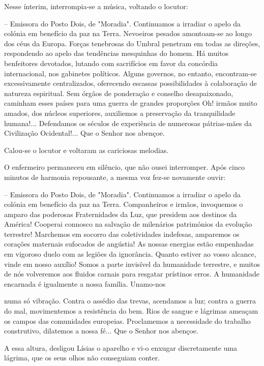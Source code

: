 \documentclass[portuguese,12pt,a4paper]{scrbook}
\begin{document}
	
	Nesse ínterim, interrompia-se a música, voltando o locutor:
	
	– Emissora do Posto Dois, de "Moradia". Continuamos a irradiar o apelo da colónia em benefício da paz na Terra. Nevoeiros pesados amontoam-se ao longo dos céus da Europa. Forças tenebrosas do Umbral penetram em todas as direções, respondendo ao apelo das tendências mesquinhas do homem. Há muitos benfeitores devotados, lutando com sacrifícios em favor da concórdia internacional, nos gabinetes políticos. Alguns governos, no entanto, encontram-se excessivamente centralizados, oferecendo escassas possibilidades à colaboração de natureza espiritual. Sem órgãos de ponderação e conselho desapaixonado, caminham esses países para uma guerra de grandes proporções Oh! irmãos muito amados, dos núcleos superiores, auxiliemos a preservação da tranquilidade humana!... Defendamos os séculos de experiência de numerosas pátrias-mães da Civilização Ocidental!... Que o Senhor nos abençoe.
	
	Calou-se o locutor e voltaram as cariciosas melodias.
	
	O enfermeiro permaneceu em silêncio, que não ousei interromper. Após cinco minutos de harmonia repousante, a mesma voz fez-se novamente ouvir:
	
	– Emissora do Posto Dois, de "Moradia". Continuamos a irradiar o apelo da colónia em benefício da paz na Terra. Companheiros e irmãos, invoquemos o amparo das poderosas Fraternidades da Luz, que presidem aos destinos da América! Cooperai connosco na salvação de milenários patrimónios da evolução terrestre! Marchemos em socorro das coletividades indefesas, amparemos os corações maternais sufocados de angústia! As nossas energias estão empenhadas em vigoroso duelo com as legiões da ignorância. Quanto estiver ao vosso alcance, vinde em nosso auxílio! Somos a parte invisível da humanidade terrestre, e muitos de nós volveremos aos fluidos carnais para resgatar prístinos erros. A humanidade encarnada é igualmente a nossa família. Unamo-nos
	
	
	numa só vibração. Contra o assédio das trevas, acendamos a luz; contra a guerra do mal, movimentemos a resistência do bem. Rios de sangue e lágrimas ameaçam os campos das comunidades europeias. Proclamemos a necessidade do trabalho construtivo, dilatemos a nossa fé... Que o Senhor nos abençoe.
	
	A essa altura, desligou Lísias o aparelho e vi-o enxugar discretamente uma lágrima, que os seus olhos não conseguiam conter.
	
\end{document}
